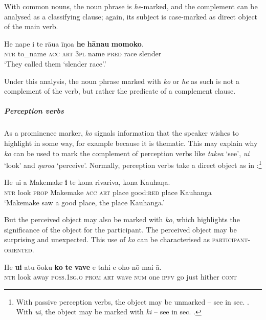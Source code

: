 With common nouns, the noun phrase is \textit{he}{}-marked, and the complement can be analysed as a classifying clause; again, its subject is case-marked as direct object of the main verb.

\ea\label{ex:8.149}
\gll He nape i te rāua {\ꞌ}īŋoa \textbf{he} \textbf{hānau} \textbf{momoko}. \\
\textsc{ntr} to\_name \textsc{acc} \textsc{art} \textsc{3pl} name \textsc{pred} race slender \\

\glt
‘They called them ‘slender race’.’ \textstyleExampleref{[R370.008]} 
\z

Under this analysis, the noun phrase marked with \textit{ko} or \textit{he} as such is not a complement of the verb, but rather the predicate of a complement clause.

\subparagraph{Perception verbs} As a prominence marker, \textit{ko} signals information that the speaker wishes to highlight in some way, for example because it is thematic. This may explain why \textit{ko} can be used to mark the complement of perception verbs like \textit{take{\ꞌ}a} ‘see’, \textit{u{\ꞌ}i} ‘look’ and \textit{ŋaro{\ꞌ}a} ‘perceive’. Normally, perception verbs take a direct object as in :\footnote{\label{fn:443}With passive perception verbs, the object may be unmarked – see  in sec. . With \textit{u{\ꞌ}i}, the object may be marked with \textit{ki} – see  in sec. .}

\ea\label{ex:8.150}
\gll He u{\ꞌ}i a Makemake \textbf{i} te kona rivariva, kona Kauhaŋa. \\
\textsc{ntr} look \textsc{prop} Makemake \textsc{acc} \textsc{art} place good:\textsc{red} place Kauhanga \\

\glt
‘Makemake saw a good place, the place Kauhanga.’ \textstyleExampleref{[Mtx-1-01.026]}
\z

But the perceived object may also be marked with \textit{ko}, which highlights the significance of the object for the participant. The perceived object may be surprising and unexpected. This use of \textit{ko} can be characterised as \textsc{participant-oriented}.

\ea\label{ex:8.151}
\gll He \textbf{u{\ꞌ}i} atu ō{\ꞌ}oku \textbf{ko} \textbf{te} \textbf{vave} e tahi e oho nō mai {\ꞌ}ā. \\
\textsc{ntr} look away \textsc{poss.1sg.o} \textsc{prom} \textsc{art} wave \textsc{num} one \textsc{ipfv} go just hither \textsc{cont} \\

